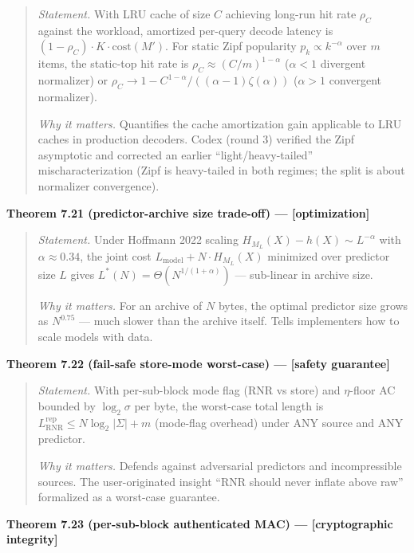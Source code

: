 \documentclass[
]{article}
\begin{document}
\begin{quote}
\emph{Statement.} With LRU cache of size $C$ achieving long-run hit
rate $\rho_C$ against the workload, amortized per-query decode latency
is $(1-\rho_C) \cdot K \cdot \mathrm{cost}(M')$. For static Zipf
popularity $p_k \propto k^{-\alpha}$ over $m$ items, the static-top
hit rate is $\rho_C \approx (C/m)^{1-\alpha}$ ($\alpha < 1$ divergent
normalizer) or $\rho_C \to 1 - C^{1-\alpha}/((\alpha-1)\zeta(\alpha))$
($\alpha > 1$ convergent normalizer).

\emph{Why it matters.} Quantifies the cache amortization gain
applicable to LRU caches in production decoders. Codex (round 3)
verified the Zipf asymptotic and corrected an earlier
``light/heavy-tailed'' mischaracterization (Zipf is heavy-tailed
in both regimes; the split is about normalizer convergence).
\end{quote}

\textbf{Theorem 7.21 (predictor-archive size trade-off) ---
{[}optimization{]}}

\begin{quote}
\emph{Statement.} Under Hoffmann 2022 scaling
$H_{M_L}(X) - h(X) \sim L^{-\alpha}$ with $\alpha \approx 0.34$, the
joint cost $L_{\mathrm{model}} + N \cdot H_{M_L}(X)$ minimized over
predictor size $L$ gives
$L^\ast(N) = \Theta(N^{1/(1+\alpha)})$
--- sub-linear in archive size.

\emph{Why it matters.} For an archive of $N$ bytes, the optimal
predictor size grows as $N^{0.75}$ — much slower than the archive
itself. Tells implementers how to scale models with data.
\end{quote}

\textbf{Theorem 7.22 (fail-safe store-mode worst-case) ---
{[}safety guarantee{]}}

\begin{quote}
\emph{Statement.} With per-sub-block mode flag (RNR vs store) and
$\eta$-floor AC bounded by $\log_2 \sigma$ per byte, the worst-case
total length is $L^{\mathrm{rep}}_{\mathrm{RNR}} \leq N \log_2 |\Sigma|
+ m$ (mode-flag overhead) under ANY source and ANY predictor.

\emph{Why it matters.} Defends against adversarial predictors and
incompressible sources. The user-originated insight ``RNR should
never inflate above raw'' formalized as a worst-case guarantee.
\end{quote}

\textbf{Theorem 7.23 (per-sub-block authenticated MAC) ---
{[}cryptographic integrity{]}}
\end{document}
